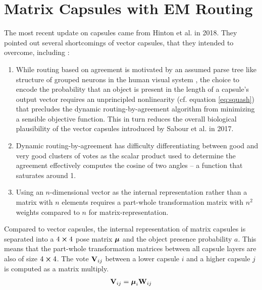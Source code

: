 \section{Matrix Capsules with EM Routing}\label{sec:matrix-capsules}
The most recent update on capsules came from Hinton et al. in 2018. They pointed out several shortcomings of vector capsules, that they intended to overcome, including \cite{hinton2018matrix}:
\begin{enumerate}
    \item While routing based on agreement is motivated by an assumed parse tree like structure of grouped neurons in the human visual system \cite{hinton2000learning}, the choice to encode the probability that an object is present in the length of a capsule's output vector requires an unprincipled nonlinearity (cf. equation \ref{eq:squash}) that precludes the dynamic routing-by-agreement algorithm from minimizing a sensible objective function. This in turn reduces the overall biological plausibility of the vector capsules introduced by Sabour et al. in 2017.
    \item Dynamic routing-by-agreement has difficulty differentiating between good and very good clusters of votes as the scalar product used to determine the agreement effectively computes the cosine of two angles -- a function that saturates around 1.
    \item Using an $n$-dimensional vector as the internal representation rather than a matrix with $n$ elements requires a part-whole transformation matrix with $n^2$ weights compared to $n$ for matrix-representation.
\end{enumerate}
Compared to vector capsules, the internal representation of matrix capsules is separated into a $4\cross 4$ pose matrix $\vb*{\mu}$ and the object presence probability $a$. This means that the part-whole transformation matrices between all capsule layers are also of size $4\cross 4$. The vote $\vb{V}_{ij}$ between a lower capsule $i$ and a higher capsule $j$ is computed as a matrix multiply.
\begin{align}
    \vb{V}_{ij} = \vb*{\mu}_i \vb{W}_{ij}
\end{align}
